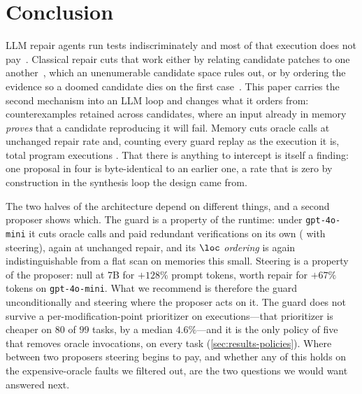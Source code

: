 \section{Conclusion}
\label{sec:conclusion}

LLM repair agents run tests indiscriminately and most of that execution does
not pay~\cite{lin2026run,chen2026rethinking}. Classical repair cuts that work
either by relating candidate patches to one
another~\cite{weimer2013leveraging,mechtaev2018testequivalence}, which an
unenumerable candidate space rules out, or by ordering the evidence so a doomed
candidate dies on the first
case~\cite{qi2013efficient,venugopal2020modification}.
This paper carries the second mechanism into an LLM loop and changes what it
orders from: counterexamples retained across candidates, where an input already
in memory \emph{proves} that a candidate reproducing it will fail. Memory cuts
oracle calls  at unchanged repair rate and, counting every guard
replay as the execution it is, total program executions . That there
is anything to intercept is itself a finding: one proposal in four is
byte-identical to an earlier one, a rate that is zero by construction in the
synthesis loop the design came from.

The two halves of the architecture depend on different things, and a second
proposer shows which. The guard is a property of the runtime: under
\texttt{gpt-4o-mini} it cuts oracle calls  and paid redundant
verifications  on its own ( with steering), again at
unchanged repair, and its $\loc$
\emph{ordering} is again indistinguishable from a flat scan on memories this
small. Steering is a property of the proposer: null at 7B for $+128\%$ prompt
tokens, worth  repair for $+67\%$ tokens on \texttt{gpt-4o-mini}. What
we recommend is therefore the guard unconditionally and steering where the
proposer acts on it. The guard does not survive a per-modification-point
prioritizer on executions---that prioritizer is cheaper on $80$ of $99$ tasks,
by a median $4.6\%$---and it is the only policy of five that removes oracle
invocations, on every task (\cref{sec:results-policies}). Where between two
proposers steering begins to pay, and whether any of this holds on the
expensive-oracle faults we filtered out, are the two questions we would want
answered next.
